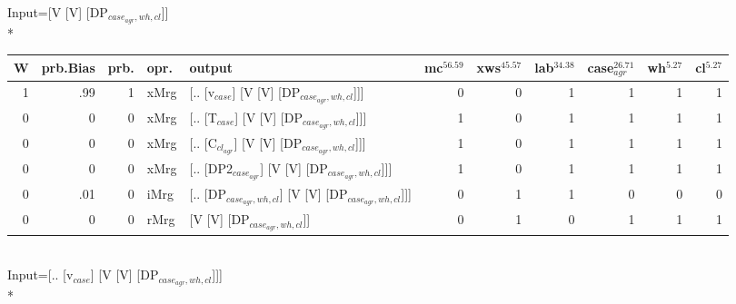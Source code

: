 \begingroup\scriptsize Input=[V [V] [DP$_{case_{agr},wh,cl}$]]\\*
\begin{tabularx}{\linewidth}{rrrlXrrrrrr}
\hline
   W &   prb.Bias &   prb. & opr.   & output                                               &   mc$^{56.59}$ &   xws$^{45.57}$ &   lab$^{34.38}$ &   case$_{agr}^{26.71}$ &   wh$^{5.27}$ &   cl$^{5.27}$ \\
\hline
   1 &       .99 &   1 & xMrg & [.. [v$_{case}$] [V [V] [DP$_{case_{agr},wh,cl}$]]]            &            0 &             0 &             1 &                  1 &           1 &           1 \\
   0 &       0 &   0 & xMrg & [.. [T$_{case}$] [V [V] [DP$_{case_{agr},wh,cl}$]]]            &            1 &             0 &             1 &                  1 &           1 &           1 \\
   0 &       0 &   0 & xMrg & [.. [C$_{cl_{agr}}$] [V [V] [DP$_{case_{agr},wh,cl}$]]]          &            1 &             0 &             1 &                  1 &           1 &           1 \\
   0 &       0 &   0 & xMrg & [.. [DP2$_{case_{agr}}$] [V [V] [DP$_{case_{agr},wh,cl}$]]]      &            1 &             0 &             1 &                  1 &           1 &           1 \\
   0 &       .01 &   0 & iMrg & [.. [DP$_{case_{agr},wh,cl}$] [V [V] [DP$_{case_{agr},wh,cl}$]]] &            0 &             1 &             1 &                  0 &           0 &           0 \\
   0 &       0 &   0 & rMrg & [V [V] [DP$_{case_{agr},wh,cl}$]]                          &            0 &             1 &             0 &                  1 &           1 &           1 \\
\hline
\end{tabularx}\endgroup\\
\begingroup\scriptsize Input=[.. [v$_{case}$] [V [V] [DP$_{case_{agr},wh,cl}$]]]\\*
